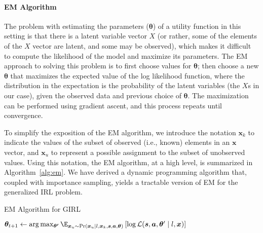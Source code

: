 
\vspace{\up}
\paragraph{EM Algorithm}

The problem with estimating the parameters ($\bm{\theta}$) of a
utility function in this setting is that there is a latent variable
vector $X$ (or rather, some of the elements of the $X$ vector are
latent, and some may be observed), which makes it difficult to compute
the likelihood of the model and maximize its parameters.  The EM
approach to solving this problem is to first choose values for
$\bm{\theta}$; then choose a new $\bm{\theta}$ that maximizes the
expected value of the log likelihood function, where the distribution
in the expectation is the probability of the latent variables (the
$X$s in our case), given the observed data and previous choice of
$\bm{\theta}$.  The maximization can be performed using gradient
ascent, and this process repeats until convergence.

To simplify the exposition of the EM algorithm, we introduce the
notation $\bm{x}_k$ to indicate the values of the subset of observed
(i.e., known) elements in an $\bm{x}$ vector, and $\bm{x}_u$ to
represent a possible assignment to the subset of unobserved values.
Using this notation, the EM algorithm, at a high level, is summarized
in Algorithm~\ref{alg:em}.
%
We have derived a dynamic programming algorithm that, coupled with
importance sampling, yields a tractable version of EM for the
generalized IRL problem.

\begin{algorithm}
\caption{EM Algorithm for GIRL}
\begin{algorithmic}
\State $\bm{\theta}_{t+1} \gets \arg \max_{\bm{\theta'}} \E_{\bm{x}_u \sim \Pr(\bm{x}_u \mid l, \bm{x}_k, \bm{s}, \bm{a}, \bm{\theta})} \left[ \log\mathcal{L}(\bm{s}, \bm{a}, \bm{\theta}' \mid l, \bm{x}) \right]$
\EndFor
\end{algorithmic}
\label{alg:em}
\end{algorithm}

